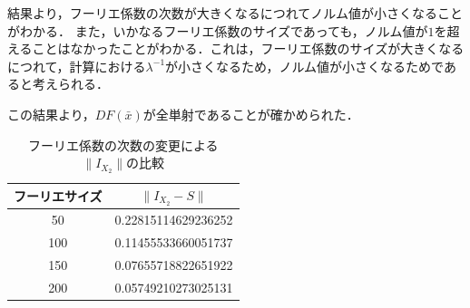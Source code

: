 結果より，フーリエ係数の次数が大きくなるにつれてノルム値が小さくなることがわかる．
また，いかなるフーリエ係数のサイズであっても，ノルム値が$1$を超えることはなかったことがわかる．これは，フーリエ係数のサイズが大きくなるにつれて，計算における$\lambda^{-1}$が小さくなるため，ノルム値が小さくなるためであると考えられる．

この結果より，$DF(\bar{x})$が全単射であることが確かめられた．

\begin{table}[htbp]
  \centering
  \caption{フーリエ係数の次数の変更による$\|I_{X_2}\|$の比較}
  \label{tab:norm-num}
  \begin{tabular}{c||c}
    フーリエサイズ & $\| I_{X_2}-S \|$ \\ \hline
    50 & 0.22815114629236252 \\
    100&0.11455533660051737\\
    150&0.07655718822651922\\
    200&0.05749210273025131
\end{tabular}
\end{table}

